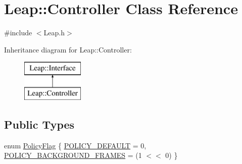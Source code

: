 \hypertarget{class_leap_1_1_controller}{\section{Leap\+:\+:Controller Class Reference}
\label{class_leap_1_1_controller}
}


{\ttfamily \#include $<$Leap.\+h$>$}

Inheritance diagram for Leap\+:\+:Controller\+:\begin{figure}[H]
\begin{center}
\leavevmode
\includegraphics[height=2.000000cm]{class_leap_1_1_controller}
\end{center}
\end{figure}
\subsection*{Public Types}
\begin{DoxyCompactItemize}
\item 
enum \hyperlink{class_leap_1_1_controller_a0bdb49fa94aa2da8b098c1ac296528d6}{Policy\+Flag} \{ \hyperlink{class_leap_1_1_controller_a0bdb49fa94aa2da8b098c1ac296528d6a94886192cfa6f6f94cd2e20b68aeca97}{P\+O\+L\+I\+C\+Y\+\_\+\+D\+E\+F\+A\+U\+L\+T} = 0, 
\hyperlink{class_leap_1_1_controller_a0bdb49fa94aa2da8b098c1ac296528d6a1e34f1992444deee3b4c905d2a765329}{P\+O\+L\+I\+C\+Y\+\_\+\+B\+A\+C\+K\+G\+R\+O\+U\+N\+D\+\_\+\+F\+R\+A\+M\+E\+S} = (1 $<$$<$ 0)
 \}
\end{DoxyCompactItemize}
